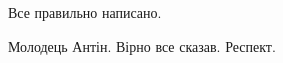 \begin{itemize}
\begin{itemize}
\end{itemize}

 
Все правильно написано.

 
Молодець Антін. Вірно все сказав. Респект.



\end{itemize}


